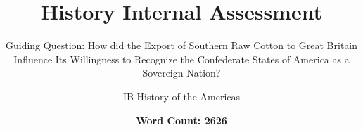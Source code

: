 \documentclass{article}
\title{History Internal Assessment}
\subtitle{Guiding Question: How did the Export of Southern Raw Cotton to Great Britain Influence Its Willingness to Recognize the
Confederate States of America as a Sovereign Nation?}
\author{IB History of the Americas}
\date{\textbf{Word Count: 2626}}
\numberwithin{equation}{section}
\numberwithin{figure}{section}
\begin{document}
\clearpage\maketitle
\thispagestyle{empty}
\newpage

\tableofcontents
\newpage

\renewcommand{\thesection}{Section \Alph{section}}
\renewcommand{\thesubsection}{\Alph{section}.\arabic{subsection}}
\renewcommand{\thefigure}{\Alph{section}.\roman{figure}}

\pagestyle{fancy}
\fancyhf{}
\fancyhead[R]{\thepage}

\section{}


\section{}


\section{} 


\printbibliography
\end{document}
